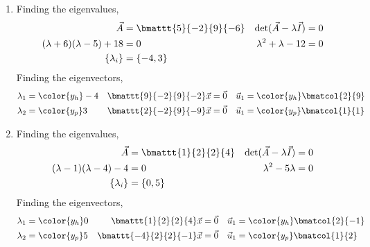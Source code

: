 \begin{enumerate}
    \item Finding the eigenvalues,
          \begin{align}
              \vec{A}                        & = \bmattt{5}{-2}{9}{-6} &
              \det(\vec{A} - \lambda\vec{I}) & = 0                       \\
              (\lambda + 6)(\lambda-5) + 18  & = 0                     &
              \lambda^2 + \lambda - 12       & = 0                       \\
              \{\lambda_i\}                  & = \{-4, 3\}
          \end{align}
          Finding the eigenvectors,
          \begin{align}
              \lambda_1                     & = \color{y_h} -4 &
              \bmattt{9}{-2}{9}{-2} \vec{x} & = \vec{0}        &
              \vec{u}_1                     & = \color{y_h}
              \bmatcol{2}{9}                                     \\
              \lambda_2                     & = \color{y_p} 3  &
              \bmattt{2}{-2}{9}{-9} \vec{x} & = \vec{0}        &
              \vec{u}_1                     & = \color{y_p}
              \bmatcol{1}{1}
          \end{align}

    \item Finding the eigenvalues,
          \begin{align}
              \vec{A}                        & = \bmattt{1}{2}{2}{4} &
              \det(\vec{A} - \lambda\vec{I}) & = 0                     \\
              (\lambda - 1)(\lambda - 4) - 4 & = 0                   &
              \lambda^2 - 5\lambda           & = 0                     \\
              \{\lambda_i\}                  & = \{0, 5\}
          \end{align}
          Finding the eigenvectors,
          \begin{align}
              \lambda_1                     & = \color{y_h} 0 &
              \bmattt{1}{2}{2}{4} \vec{x}   & = \vec{0}       &
              \vec{u}_1                     & = \color{y_h}
              \bmatcol{2}{-1}                                   \\
              \lambda_2                     & = \color{y_p} 5 &
              \bmattt{-4}{2}{2}{-1} \vec{x} & = \vec{0}       &
              \vec{u}_1                     & = \color{y_p}
              \bmatcol{1}{2}
          \end{align}


\end{enumerate}
